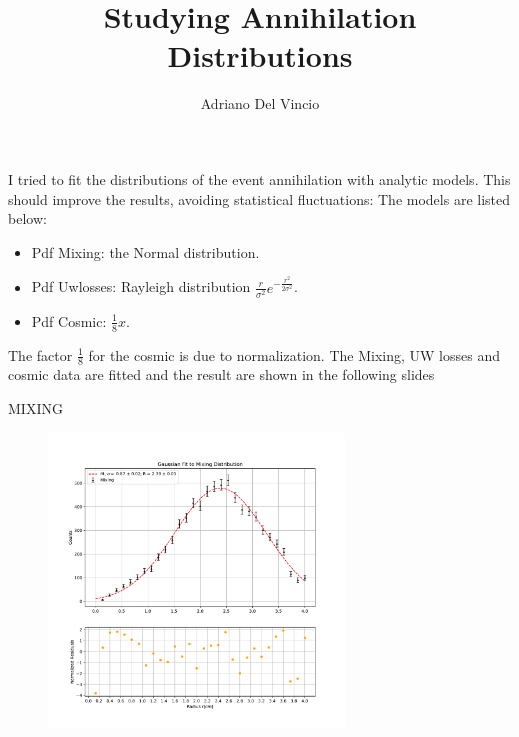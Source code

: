 \documentclass[9pt]{beamer}
\author{Adriano Del Vincio}
\title{Studying Annihilation Distributions}
\begin{document}
\begin{frame}
\titlepage
\end{frame}


\begin{frame}{}

I tried to fit the distributions of the event annihilation with analytic models. This should improve the results, avoiding statistical fluctuations:
The models are listed below:
\begin{itemize}
\item Pdf Mixing: the Normal distribution.
\item Pdf Uwlosses: Rayleigh distribution $\frac{r}{\sigma^{2}} e^{-\frac{r^{2}}{2 \sigma^{2}}}$.
\item Pdf Cosmic: $\frac{1}{8} x$.
\end{itemize}

The factor $\frac{1}{8}$ for the cosmic is due to normalization. The Mixing, UW losses and cosmic data are fitted and the result are shown in the following slides 
\end{frame}

\begin{frame}{MIXING}

\begin{figure}
\includegraphics[width = 0.7\textwidth]{GaussianFitMixing.pdf}
\end{figure}

\end{frame}
\end{document}
